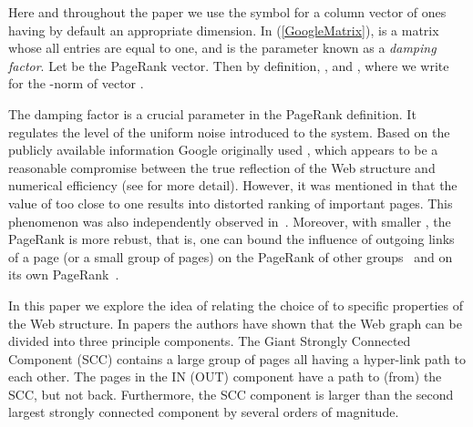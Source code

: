 \documentclass{article}
\begin{document}
Here and throughout the paper we use the
symbol  for a column vector of ones having by default an
appropriate dimension. In (\ref{GoogleMatrix}),  is a matrix whose all entries
are equal to one, and  is the parameter known as a {\it damping factor}. Let  be
the PageRank vector. Then by definition, , and
, where we write  for the
-norm of vector .

The damping factor  is a crucial parameter in the PageRank
definition. It regulates the level of the uniform noise introduced
to the system. Based on the publicly available information Google
originally used , which appears to be a reasonable
compromise between the true reflection of the Web structure and
numerical efficiency (see \cite{LangvilleMeyer} for more detail).
However, it was mentioned in \cite{Boldi05} that the value of 
too close to one results into distorted ranking of important pages.
This phenomenon was also independently observed
in~\cite{Avrachenkov06SM}. Moreover, with smaller , the PageRank
is more rebust, that is, one can bound the influence of outgoing
links of a page (or a small group of pages) on the PageRank of other
groups~\cite{Bianchini05} and on its own
PageRank~\cite{Avrachenkov06SM}.

In this paper we explore the idea of relating the choice of  to
specific properties of the Web structure. In papers
\cite{Broder00,Kumar00} the authors have shown that the Web graph
can be divided into three principle components. The Giant Strongly
Connected Component (SCC) contains a large group of pages all having
a hyper-link path to each other. The pages in the IN (OUT) component
have a path to (from) the SCC, but not back. Furthermore, the SCC
component is larger than the second largest strongly connected
component by several orders of magnitude.
\end{document}

